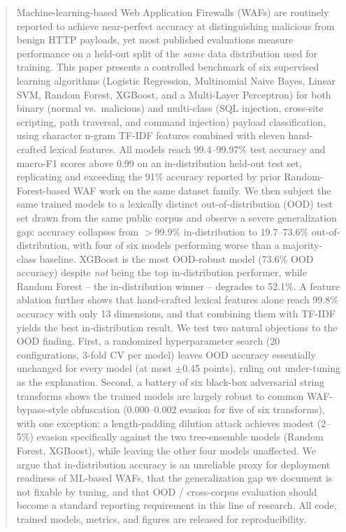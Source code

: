 \documentclass{ieeeaccess}
\begin{document}
\begin{abstract}
Machine-learning-based Web Application Firewalls (WAFs) are routinely reported
to achieve near-perfect accuracy at distinguishing malicious from benign HTTP
payloads, yet most published evaluations measure performance on a held-out
split of the \emph{same} data distribution used for training. This paper
presents a controlled benchmark of six supervised learning algorithms
(Logistic Regression, Multinomial Naive Bayes, Linear SVM, Random Forest,
XGBoost, and a Multi-Layer Perceptron) for both binary (normal vs.\ malicious)
and multi-class (SQL injection, cross-site scripting, path traversal, and
command injection) payload classification, using character n-gram TF-IDF
features combined with eleven hand-crafted lexical features. All models reach
99.4--99.97\% test accuracy and macro-F1 scores above 0.99 on an
in-distribution held-out test set, replicating and exceeding the 91\% accuracy
reported by prior Random-Forest-based WAF work on the same dataset family. We
then subject the same trained models to a lexically distinct out-of-distribution
(OOD) test set drawn from the same public corpus and observe a severe
generalization gap: accuracy collapses from $>$99.9\% in-distribution to
19.7--73.6\% out-of-distribution, with four of six models performing worse
than a majority-class baseline. XGBoost is the most OOD-robust model
(73.6\% OOD accuracy) despite \emph{not} being the top in-distribution
performer, while Random Forest -- the in-distribution winner -- degrades to
52.1\%. A feature ablation further shows that hand-crafted lexical features
alone reach 99.8\% accuracy with only 13 dimensions, and that combining them
with TF-IDF yields the best in-distribution result. We test two natural
objections to the OOD finding. First, a randomized hyperparameter search
(20 configurations, 3-fold CV per model) leaves OOD accuracy essentially
unchanged for every model (at most $\pm$0.45 points), ruling out
under-tuning as the explanation. Second, a battery of six black-box
adversarial string transforms shows the trained models are largely robust
to common WAF-bypass-style obfuscation (0.000--0.002 evasion for five of
six transforms), with one exception: a length-padding dilution attack
achieves modest (2--5\%) evasion specifically against the two
tree-ensemble models (Random Forest, XGBoost), while leaving the other four
models unaffected. We argue that in-distribution accuracy is an unreliable
proxy for deployment readiness of ML-based WAFs, that the generalization
gap we document is not fixable by tuning, and that OOD / cross-corpus
evaluation should become a standard reporting requirement in this line of
research. All code, trained models, metrics, and figures are released for
reproducibility.
\end{abstract}
\end{document}
